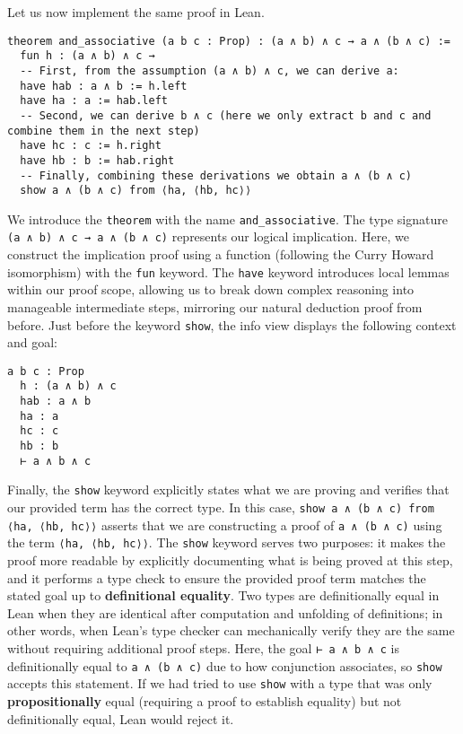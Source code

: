\begin{example}
  Let us now implement the same proof in Lean.
  \newpage
  \begin{lstlisting}[language=lean]
theorem and_associative (a b c : Prop) : (a ∧ b) ∧ c → a ∧ (b ∧ c) :=
  fun h : (a ∧ b) ∧ c →
  -- First, from the assumption (a ∧ b) ∧ c, we can derive a:
  have hab : a ∧ b := h.left
  have ha : a := hab.left 
  -- Second, we can derive b ∧ c (here we only extract b and c and combine them in the next step)
  have hc : c := h.right
  have hb : b := hab.right
  -- Finally, combining these derivations we obtain a ∧ (b ∧ c)
  show a ∧ (b ∧ c) from ⟨ha, ⟨hb, hc⟩⟩
\end{lstlisting}
  We introduce the \lstinline[language=lean]|theorem| with the name
  \lstinline[language=lean]|and_associative|.
  The type signature \lstinline[language=lean]|(a ∧ b) ∧ c → a ∧ (b ∧ c)|
  represents our logical implication.
  Here, we construct the implication proof using a
  function (following the Curry Howard isomorphism) with the \lstinline[language=lean]|fun| keyword.
  The \lstinline[language=lean]|have| keyword introduces local
  lemmas within our proof scope, allowing us to break down complex
  reasoning into manageable intermediate steps,
  mirroring our natural deduction proof from before.
  Just before the keyword \lstinline[language=lean]|show|,
  the info view displays the following
  context and goal:
  \begin{lstlisting}[language=lean]
  a b c : Prop
  h : (a ∧ b) ∧ c
  hab : a ∧ b
  ha : a
  hc : c
  hb : b
  ⊢ a ∧ b ∧ c
\end{lstlisting}
  Finally, the \lstinline[language=lean]|show| keyword explicitly states what
  we are proving and verifies that our provided term has the correct type.
  In this case, \lstinline[language=lean]|show a ∧ (b ∧ c) from ⟨ha, ⟨hb, hc⟩⟩|
  asserts that we are constructing a proof of \lstinline[language=lean]|a ∧ (b ∧ c)|
  using the term \lstinline[language=lean]|⟨ha, ⟨hb, hc⟩⟩|.
  The \lstinline[language=lean]|show| keyword serves two
  purposes:
  it makes the proof more readable by explicitly
  documenting what is being proved at this step,
  and it performs a type check to ensure the provided
  proof term matches the stated
  goal up to \textbf{definitional equality}.
  Two types are definitionally equal in Lean when they
  are identical after computation
  and unfolding of definitions; in other words, when Lean's type checker
  can mechanically verify they are the same without requiring additional proof steps.
  Here, the goal \lstinline[language=lean]|⊢ a ∧ b ∧ c| is definitionally
  equal to \lstinline[language=lean]|a ∧ (b ∧ c)| due to how conjunction
  associates, so \lstinline[language=lean]|show| accepts this statement.
  If we had tried to use \lstinline[language=lean]|show| with a type that
  was only \textbf{propositionally} equal (requiring a proof to establish equality)
  but not definitionally equal, Lean would reject it.
\end{example}
